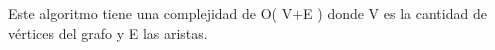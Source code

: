 Este algoritmo tiene una complejidad de O( V+E ) donde V es la cantidad de vértices del grafo y E las aristas.